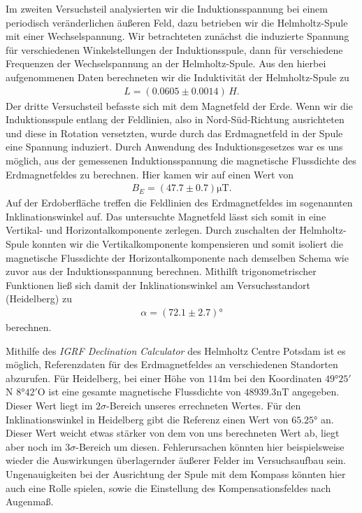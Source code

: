 Im zweiten Versuchsteil analysierten wir die Induktionsspannung bei einem periodisch veränderlichen äußeren Feld, dazu betrieben wir die Helmholtz-Spule mit einer Wechselspannung. Wir betrachteten zunächst die induzierte Spannung für verschiedenen Winkelstellungen der Induktionsspule, dann für verschiedene Frequenzen der Wechselspannung an der Helmholtz-Spule. Aus den hierbei aufgenommenen Daten berechneten wir die Induktivität der Helmholtz-Spule zu
\begin{align*}
  L = (0.0605 \pm 0.0014)\, \si{H}.
\end{align*}
Der dritte Versuchsteil befasste sich mit dem Magnetfeld der Erde. Wenn wir die Induktionsspule entlang der Feldlinien, also in Nord-Süd-Richtung ausrichteten und diese in Rotation versetzten, wurde durch das Erdmagnetfeld in der Spule eine Spannung induziert. Durch Anwendung des Induktionsgesetzes war es uns möglich, aus der gemessenen Induktionsspannung die magnetische Flussdichte des Erdmagnetfeldes zu berechnen. Hier kamen wir auf einen Wert von
\begin{align*}
  B_{E} = (47.7 \pm 0.7)\unit{\micro\tesla}.
\end{align*}
Auf der Erdoberfläche treffen die Feldlinien des Erdmagnetfeldes im sogenannten Inklinationswinkel auf. Das untersuchte Magnetfeld lässt sich somit in eine Vertikal- und Horizontalkomponente zerlegen. Durch zuschalten der Helmholtz-Spule konnten wir die Vertikalkomponente kompensieren und somit \glqq{}isoliert\grqq{} die magnetische Flussdichte der Horizontalkomponente nach demselben Schema wie zuvor aus der Induktionsspannung berechnen. Mithilft trigonometrischer Funktionen ließ sich damit der Inklinationswinkel am Versuchsstandort (Heidelberg) zu
\begin{align}
  \alpha = (72.1 \pm 2.7) \si{\degree}
\end{align}
berechnen.

Mithilfe des \textit{IGRF Declination Calculator} des Helmholtz Centre Potsdam ist es möglich, Referenzdaten für des Erdmagnetfeldes an verschiedenen Standorten abzurufen. Für Heidelberg, bei einer Höhe von $114\si{\meter}$ bei den Koordinaten $49\si{\degree} 25'$N $8 \si{\degree} 42'$O ist eine gesamte magnetische Flussdichte von $48939.3 \si{\nano\tesla}$ angegeben. Dieser Wert liegt im $2\sigma$-Bereich unseres errechneten Wertes. Für den Inklinationswinkel in Heidelberg gibt die Referenz einen Wert von $65.25\si{\degree}$ an. Dieser Wert weicht etwas stärker von dem von uns berechneten Wert ab, liegt aber noch im $3\sigma$-Bereich um diesen. Fehlerursachen könnten hier beispielsweise wieder die Auswirkungen überlagernder äußerer Felder im Versuchsaufbau sein. Ungenauigkeiten bei der Ausrichtung der Spule mit dem Kompass könnten hier auch eine Rolle spielen, sowie die Einstellung des Kompensationsfeldes nach Augenmaß.

